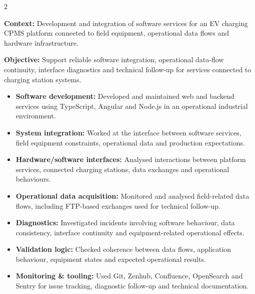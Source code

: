 \documentclass[8pt,a4paper,ragged2e,withhyper]{altacv}
\begin{document}



\makecvheader
\vspace{-0.3cm}


\begin{paracol}{2}



\textbf{Context:} Development and integration of software services for an EV charging CPMS platform connected to field equipment, operational data flows and hardware infrastructure.

\textbf{Objective:} Support reliable software integration, operational data-flow continuity, interface diagnostics and technical follow-up for services connected to charging station systems.

\begin{itemize}
  \item \textbf{Software development:} Developed and maintained web and backend services using TypeScript, Angular and Node.js in an operational industrial environment.
  \item \textbf{System integration:} Worked at the interface between software services, field equipment constraints, operational data and production expectations.
  \item \textbf{Hardware/software interfaces:} Analysed interactions between platform services, connected charging stations, data exchanges and operational behaviours.
  \item \textbf{Operational data acquisition:} Monitored and analysed field-related data flows, including FTP-based exchanges used for technical follow-up.
  \item \textbf{Diagnostics:} Investigated incidents involving software behaviour, data consistency, interface continuity and equipment-related operational effects.
  \item \textbf{Validation logic:} Checked coherence between data flows, application behaviour, equipment states and expected operational results.
  \item \textbf{Monitoring \& tooling:} Used Git, Zenhub, Confluence, OpenSearch and Sentry for issue tracking, diagnostic follow-up and technical documentation.
\end{itemize}


\end{paracol}
\end{document}
